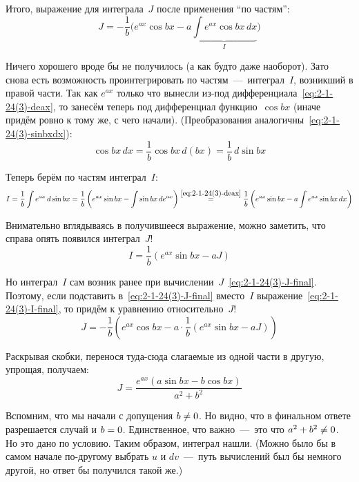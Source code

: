 \documentclass[a4paper,12pt]{article}
\begin{document}
\begin{solution}
    Итого, выражение для интеграла~$J$ после применения ``по частям'':
    \begin{equation}\label{eq:2-1-24(3)-J-final}
      J = -\frac{1}{b} \Biggl(e^{ax} \cos{bx} - a \underbrace{\int e^{ax} \cos{bx}\, dx}_{I}\Biggr)
    \end{equation}
    
    Ничего хорошего вроде бы не получилось (а как будто даже наоборот).
    Зато снова есть возможность проинтегрировать по частям~---~интеграл~$I$, возникший в правой части.
    Так как $e^{ax}$ только что вынесли из-под дифференциала~\eqref{eq:2-1-24(3)-deax}, то занесём теперь под дифференциал функцию~$\cos bx$ (иначе придём ровно к тому же, с чего начали).
    (Преобразования аналогичны~\eqref{eq:2-1-24(3)-sinbxdx}):
    \[
      \cos{bx}\, dx = \frac{1}{b} \cos{bx}\, d(bx) = \frac{1}{b}\, d\sin{bx}
    \]
    
    Теперь берём по частям интеграл~$I$:
    \[
      I = \frac{1}{b} \int e^{ax}\, d\sin{bx}
        = \frac{1}{b} \left(e^{ax} \sin{bx} - \int \sin{bx}\, de^{ax}\right)
        \overset{\eqref{eq:2-1-24(3)-deax}}{=} \frac{1}{b} \left(e^{ax} \sin{bx} - a \int e^{ax} \sin{bx}\, dx\right)
    \]
    
    Внимательно вглядываясь в получившееся выражение, можно заметить, что справа опять появился интеграл~$J$!
    \begin{equation}\label{eq:2-1-24(3)-I-final}
      I = \frac{1}{b} \left(e^{ax} \sin{bx} - a J\right)
    \end{equation}
    
    Но интеграл~$I$ сам возник ранее при вычислении~$J$~\eqref{eq:2-1-24(3)-J-final}.
    Поэтому, если подставить в~\eqref{eq:2-1-24(3)-J-final} вместо~$I$ выражение~\eqref{eq:2-1-24(3)-I-final}, то придём к уравнению относительно~$J$!
    \[
      J = -\frac{1}{b} \left(e^{ax} \cos{bx} - a \cdot \frac{1}{b} \left(e^{ax} \sin{bx} - a J\right)\right) 
    \]
    
    Раскрывая скобки, перенося туда-сюда слагаемые из одной части в другую, упрощая, получаем:
    \[
      J = \frac{e^{ax} (a \sin{bx} - b \cos{bx})}{a^2 + b^2}
    \]
    
    Вспомним, что мы начали с допущения $b \hm{\not=} 0$.
    Но видно, что в финальном ответе разрешается случай и $b \hm= 0$.
    Единственное, что важно~---~это что $a^2 \hm+ b^2 \hm{\not=} 0$.
    Но это дано по условию.
    Таким образом, интеграл нашли.
    (Можно было бы в самом начале по-другому выбрать $u$ и $dv$~---~путь вычислений был бы немного другой, но ответ бы получился такой же.)
  \end{solution}
  
  
\end{document}
